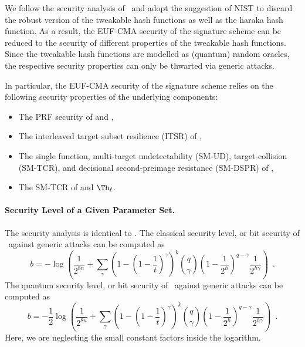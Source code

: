 We follow the security analysis of \SPHINCSP\ and adopt the suggestion of NIST \cite{nistdecision} to discard the robust version of the tweakable hash functions as well as the \textsf{haraka} hash function. As a result, the EUF-CMA security of the signature scheme can be reduced to the security of different properties of the tweakable hash functions. Since the tweakable hash functions are modelled as (quantum) random oracles, the respective security properties can only be thwarted via generic attacks.

In particular, the EUF-CMA security of the signature scheme relies on the following security properties of the underlying components:

\begin{itemize}
    \item The PRF security of \PRF and \PRFmsg,

    \item The interleaved target subset resilience (ITSR) of \hashmsg,

    \item The single function, multi-target undetectability (SM-UD), target-collision (SM-TCR), and decisional second-preimage resistance (SM-DSPR) of \hashF,

    \item The SM-TCR of \hashH and $\Th_\ell$.
\end{itemize}


\paragraph{Security Level of a Given Parameter Set.}

The security analysis is identical to \SPHINCSP. The classical security level, or bit security of \SPHINCSA\ against generic attacks can be computed as
$$
b=-\log\left(
    \frac{1}{2^{8n}}+
    \sum_{\gamma}
        \left(1-\left(1-\frac{1}{t}\right)^{\gamma}\right)^{k}
        \binom{q}{\gamma}
        \left(1-\frac{1}{2^{h}}\right)^{q-\gamma}
        \frac{1}{2^{h\gamma}}
    \right) \enspace.
$$
The quantum security level, or bit security of \SPHINCSA\ against generic attacks can be computed as
$$
b=-\frac{1}{2}\log\left(
    \frac{1}{2^{8n}}+
    \sum_{\gamma}
        \left(1-\left(1-\frac{1}{t}\right)^{\gamma}\right)^{k}
        \binom{q}{\gamma}
        \left(1-\frac{1}{2^{h}}\right)^{q-\gamma}
        \frac{1}{2^{h\gamma}}
    \right) \enspace.
$$
Here, we are neglecting the small constant factors inside the logarithm. 

